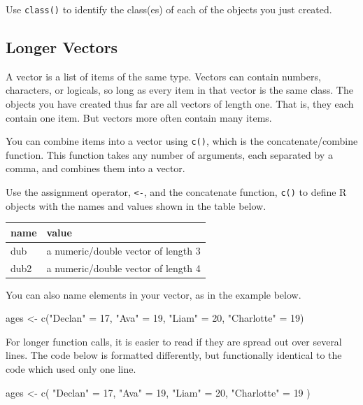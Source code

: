 \documentclass[
]{book}
\newenvironment{Shaded}{\begin{snugshade}}{\end{snugshade}}
\newcommand{\DecValTok}[1]{\textcolor[rgb]{0.00,0.00,0.81}{#1}}
\newcommand{\FunctionTok}[1]{\textcolor[rgb]{0.00,0.00,0.00}{#1}}
\newcommand{\NormalTok}[1]{#1}
\newcommand{\OtherTok}[1]{\textcolor[rgb]{0.56,0.35,0.01}{#1}}
\newcommand{\StringTok}[1]{\textcolor[rgb]{0.31,0.60,0.02}{#1}}
\begin{document}
Use \texttt{class()} to identify the class(es) of each of the objects you just created.

\hypertarget{longer-vectors}{%
\subsection{Longer Vectors}\label{longer-vectors}}

A vector is a list of items of the same type. Vectors can contain numbers, characters, or logicals, so long as every item in that vector is the same class. The objects you have created thus far are all vectors of length one. That is, they each contain one item. But vectors more often contain many items.

You can combine items into a vector using \texttt{c()}, which is the concatenate/combine function. This function takes any number of arguments, each separated by a comma, and combines them into a vector.

Use the assignment operator, \texttt{\textless{}-}, and the concatenate function, \texttt{c()} to define R objects with the names and values shown in the table below.

\begin{longtable}[]{@{}ll@{}}
\toprule
name & value \\
\midrule
\endhead
dub & a numeric/double vector of length 3 \\
dub2 & a numeric/double vector of length 4 \\
\bottomrule
\end{longtable}

You can also name elements in your vector, as in the example below.

\begin{Shaded}
\begin{Highlighting}[]
\NormalTok{ages }\OtherTok{\textless{}{-}} \FunctionTok{c}\NormalTok{(}\StringTok{"Declan"} \OtherTok{=} \DecValTok{17}\NormalTok{, }\StringTok{"Ava"} \OtherTok{=} \DecValTok{19}\NormalTok{, }\StringTok{"Liam"} \OtherTok{=} \DecValTok{20}\NormalTok{, }\StringTok{"Charlotte"} \OtherTok{=} \DecValTok{19}\NormalTok{)}
\end{Highlighting}
\end{Shaded}

For longer function calls, it is easier to read if they are spread out over several lines. The code below is formatted differently, but functionally identical to the code which used only one line.

\begin{Shaded}
\begin{Highlighting}[]
\NormalTok{ages }\OtherTok{\textless{}{-}} \FunctionTok{c}\NormalTok{(}
  \StringTok{"Declan"} \OtherTok{=} \DecValTok{17}\NormalTok{,}
  \StringTok{"Ava"} \OtherTok{=} \DecValTok{19}\NormalTok{,}
  \StringTok{"Liam"} \OtherTok{=} \DecValTok{20}\NormalTok{,}
  \StringTok{"Charlotte"} \OtherTok{=} \DecValTok{19}
\NormalTok{)}
\end{Highlighting}
\end{Shaded}
\end{document}
